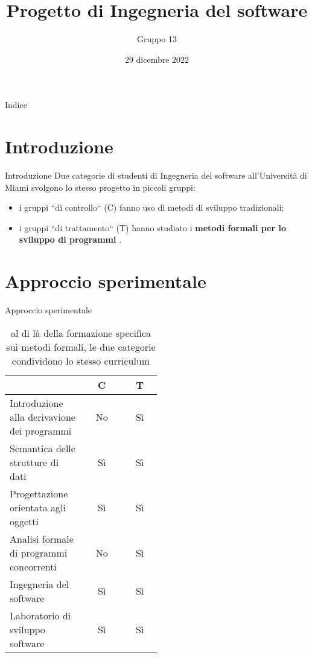 \documentclass{beamer}
\title{Progetto di Ingegneria del software}
\author{Gruppo 13}
\institute{Università di Bologna}
\date{29 dicembre 2022}
\begin{document}
\begin{frame}
	\titlepage
\end{frame}

\begin{frame}{Indice}
	\tableofcontents
\end{frame}

\section{Introduzione}
\begin{frame}{Introduzione}
	Due categorie di studenti di Ingegneria del software all'Università di Miami
	svolgono lo stesso progetto in piccoli gruppi:
	\begin{itemize}
		\item i gruppi ``di controllo`` (C) fanno uso di metodi di sviluppo
		      tradizionali;
		\item i gruppi ``di trattamento`` (T) hanno studiato i \textbf{metodi
			      formali per lo sviluppo di programmi} .
	\end{itemize}
\end{frame}

\section{Approccio sperimentale}
\begin{frame}{Approccio sperimentale}
	\begin{table}
		\begin{tabular}{|p{0.5\linewidth}|c|c|}
			\hline
			                                            & C  & T  \\
			\hline
			Introduzione alla derivavione dei programmi & No & Sì \\
			\hline
			Semantica delle strutture di dati           & Sì & Sì \\
			\hline
			Progettazione orientata agli oggetti        & Sì & Sì \\
			\hline
			Analisi formale di programmi concorrenti    & No & Sì \\
			\hline
			Ingegneria del software                     & Sì & Sì \\
			\hline
			Laboratorio di sviluppo software            & Sì & Sì \\
			\hline
		\end{tabular}
		\caption{al di là della formazione specifica sui metodi formali, le due
			categorie condividono lo stesso curriculum}
	\end{table}

\end{frame}
\end{document}
